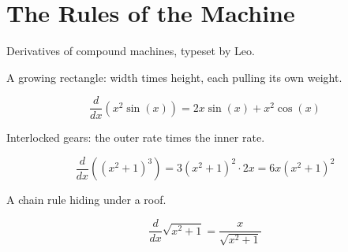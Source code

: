 
\section{The Rules of the Machine}

Derivatives of compound machines, typeset by Leo.

A growing rectangle: width times height, each pulling its own weight.

$$ \frac{d}{dx}\left( x^2 \sin(x) \right) = 2x\sin(x) + x^2\cos(x) $$

Interlocked gears: the outer rate times the inner rate.

$$ \frac{d}{dx}\left( (x^2+1)^3 \right) = 3(x^2+1)^2 \cdot 2x = 6x(x^2+1)^2 $$

A chain rule hiding under a roof.

$$ \frac{d}{dx} \sqrt{x^2+1} = \frac{x}{\sqrt{x^2+1}} $$
